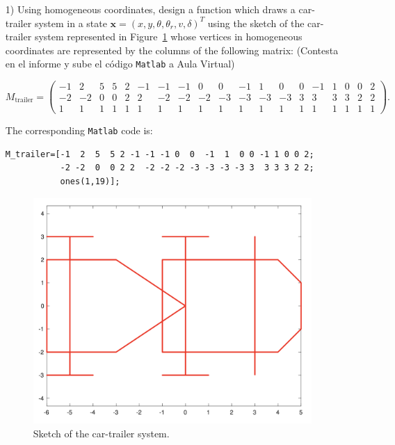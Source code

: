 \documentclass{article}
\begin{document}
\begin{itemize}

\item[1)] Using homogeneous coordinates, design a function which draws a car-trailer system in a state $\mathbf{x} =
(x, y, \theta, \theta_r, v, \delta)^T$ using the sketch of the car-trailer system represented in Figure~\ref{fig:figure1} 
whose vertices in homogeneous coordinates are represented by the columns of the following matrix:
(Contesta en el informe y sube el c\'odigo \texttt{Matlab} a Aula Virtual)

\begin{scriptsize}
 \begin{equation*}
M_{\text{trailer}} =
\begin{pmatrix}
-1 & 2  &5  &5 &2 &-1 &-1 &-1 &0  &0  &-1  &1  &0 &0 &-1 &1 &0 &0 &2 \\
-2 &-2 &0  &0 &2 &2  &-2 &-2 &-2 &-3 &-3 &-3 &-3 &3  &3 &3 &3 &2 &2\\
1 &1 &1  &1   &1   &1 &1 &1 &1 &1 &1 &1 &1 &1 &1 &1 &1 &1 &1
\end{pmatrix}.
\end{equation*}
\end{scriptsize}
The corresponding \texttt{Matlab} code is:
\begin{scriptsize}
\begin{verbatim}
M_trailer=[-1  2  5  5 2 -1 -1 -1 0  0  -1  1  0 0 -1 1 0 0 2; 
           -2 -2  0  0 2 2  -2 -2 -2 -3 -3 -3 -3 3  3 3 3 2 2;
           ones(1,19)];
\end{verbatim}                    
\end{scriptsize}                    
                    
                    
\begin{figure}[H]
\centerline{\includegraphics[width=0.99\columnwidth]{figures/chassis-trailer}}
\caption{Sketch of the car-trailer system.}
\label{fig:figure1}
\end{figure}




\end{itemize}
\end{document}
